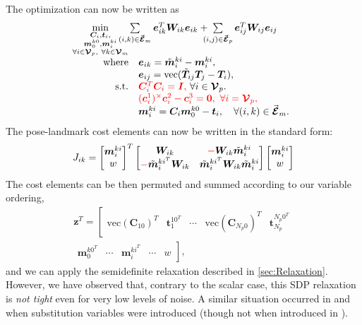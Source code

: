 \documentclass[lettersize,journal]{IEEEtran}
\newcommand{\EdgeSet}{\vec{\bm{\mathcal{E}}}}
\newcommand{\VertSetP}{\bm{\mathcal{V}}_p}
\newcommand{\VertSetM}{\bm{\mathcal{V}}_m}
\newcommand{\vect}[1]{\mbox{vec}(#1)}
\newcommand{\rev}[1]{\color{red}{#1}\color{black}}
\begin{document}
The optimization can now be written as
\begin{equation}
	\hspace*{-5pt}
	\label{opt:SLAM}
	\begin{array}{rl} 
		\min \limits_{ \substack{\bm{C}_i,\bm{t}_i, \\ \bm{m}_0^{k0},\bm{m}_i^{ki} \\ \forall i\in \VertSetP,~ \forall k\in\VertSetM } } & \hspace*{-20pt}\sum\limits_{(i,k)\in\EdgeSet_m} \bm{e}_{ik}^T \bm{W}_{ik} \bm{e}_{ik} + \hspace*{-7pt}\sum\limits_{(i,j)\in\EdgeSet_p}  \bm{e}_{ij}^T \bm{W}_{ij} \bm{e}_{ij}\hfill \\
		\mbox{where} & \bm{e}_{ik} = \tilde{\bm{m}}_i^{ki} - \bm{m}_i^{ki},\\
		&\bm{e}_{ij} = \vect{\tilde{\bm{T}}_{ij}\bm{T}_j - \bm{T}_i},\\
		\mbox{s.t.}&\rev{\bm{C}_i^T \bm{C}_i = \bm{I},}~\forall i \in \VertSetP.\\
		& \rev{(\bm{c}_i^{1})^\times\bm{c}_i^{2} - \bm{c}_i^{3} = \bm{0},~\forall i = \VertSetP,}\\
		& \bm{m}_i^{ki} = \bm{C}_i\bm{m}_0^{k0} - \bm{t}_i, \quad \forall (i,k)\in\EdgeSet_m.
	\end{array}
\end{equation}
The pose-landmark cost elements can now be written in the standard form:
\begin{equation*}
	J_{ik}=\begin{bmatrix}
		\bm{m}_i^{ki}\\w
	\end{bmatrix}^T \begin{bmatrix}
		\bm{W}_{ik} & \rev{-}\bm{W}_{ik}\tilde{\bm{m}}_i^{ki}\\
		\rev{-}\tilde{\bm{m}}_i^{ki^T}\bm{W}_{ik} & \tilde{\bm{m}}_i^{ki^T}\bm{W}_{ik}\tilde{\bm{m}}_i^{ki}
	\end{bmatrix}\begin{bmatrix}
	\bm{m}_i^{ki}\\w
	\end{bmatrix}
\end{equation*}
The cost elements can be then permuted and summed according to our variable ordering,
\begin{multline}
	\bm{z}^T = \left[\begin{matrix}\vect{\bm{C}_{10}}^T &\bm{t}_1^{10^T} & \cdots &\vect{\bm{C}_{N_p0}}^T&\bm{t}_{N_p}^{N_p0^T} \end{matrix}\right. \\
		\left.\begin{matrix} \bm{m}_0^{k0^T} &\cdots& \bm{m}_i^{ki^T} & \cdots & w \end{matrix}\right],
\end{multline}
and we can apply the semidefinite relaxation described in \ref{sec:Relaxation}. However, we have observed that, contrary to the scalar case, this SDP relaxation is \emph{not tight} even for very low levels of noise. A similar situation occurred in \cite{brialesCertifiablyGloballyOptimal2018} and \cite{yangTEASERFastCertifiable2021} when substitution variables were introduced (though not when introduced in \cite{dumbgenSafeSmoothCertified2023}).
\end{document}
